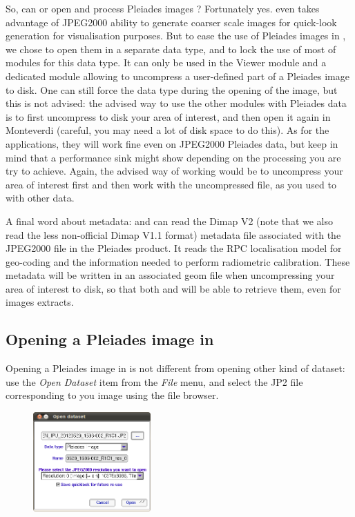So, can \mont or \app open and process Pleiades images ? Fortunately
yes. \mont even takes advantage of JPEG2000 ability to generate
coarser scale images for quick-look generation for visualisation
purposes. But to ease the use of Pleiades images in \mont, we chose to
open them in a separate data type, and to lock the use of most of
modules for this data type. It can only be used in the Viewer module
and a dedicated module allowing to uncompress a user-defined part of a
Pleiades image to disk. One can still force the data type during the
opening of the image, but this is not advised: the advised way to use
the other modules with Pleiades data is to first uncompress to disk
your area of interest, and then open it again in Monteverdi (careful,
you may need a lot of disk space to do this). As for the applications,
they will work fine even on JPEG2000 Pleiades data, but keep in mind
that a performance sink might show depending on the processing you are
try to achieve. Again, the advised way of working would be to
uncompress your area of interest first and then work with the
uncompressed file, as you used to with other data.

A final word about metadata: \app and \mont can read the Dimap V2
(note that we also read the less non-official Dimap V1.1 format)
metadata file associated with the JPEG2000 file in the Pleiades
product. It reads the RPC localisation model for geo-coding and the
information needed to perform radiometric calibration. These metadata
will be written in an associated geom file when uncompressing your
area of interest to disk, so that both \mont and \app will be able to
retrieve them, even for images extracts.

\subsection{Opening a Pleiades image in \mont}

Opening a Pleiades image in \mont is not different from opening other
kind of dataset: use the \textit{Open Dataset} item from the
\textit{File} menu, and select the JP2 file corresponding to you image
using the file browser.

\begin{figure}
  \center
  \includegraphics[width=0.4\textwidth]{../Art/MonteverdiImages/pleiades_open.png}
  \label{fig:pleiades_open}
\end{figure}

